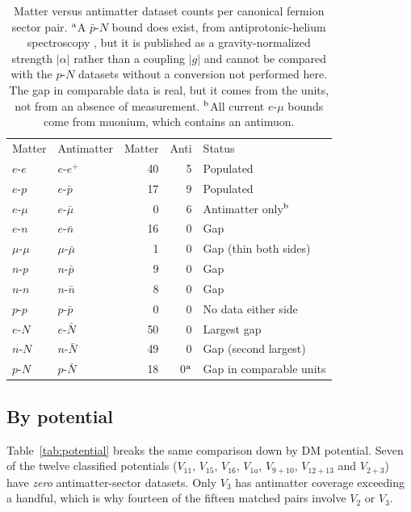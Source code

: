 \documentclass[
  aps,
  prd,
  reprint,
  amsmath,
  amssymb,
  nofootinbib,
  superscriptaddress,
  floatfix
]{revtex4-2}
\begin{document}
\begin{table}[t]
\caption{\label{tab:sector}%
Matter versus antimatter dataset counts per canonical fermion sector pair.
$^{\rm a}$A $\bar p$-$N$ bound does exist, from antiprotonic-helium
spectroscopy \cite{Salumbides2014}, but it is published as a
gravity-normalized strength $|\alpha|$ rather than a coupling $|g|$ and
cannot be compared with the $p$-$N$ datasets without a conversion not
performed here. The gap in comparable data is real, but it comes from the
units, not from an absence of measurement. $^{\rm b}$All current
$e$-$\mu$ bounds come from muonium, which contains an antimuon.}
\begin{ruledtabular}
\begin{tabular}{llrrl}
Matter & Antimatter & Matter & Anti & Status \\
\colrule
$e$-$e$     & $e$-$e^+$        & 40 & 5 & Populated \\
$e$-$p$     & $e$-$\bar p$     & 17 & 9 & Populated \\
$e$-$\mu$   & $e$-$\bar\mu$    &  0 & 6 & Antimatter only$^{\rm b}$ \\
$e$-$n$     & $e$-$\bar n$     & 16 & 0 & Gap \\
$\mu$-$\mu$ & $\mu$-$\bar\mu$  &  1 & 0 & Gap (thin both sides) \\
$n$-$p$     & $n$-$\bar p$     &  9 & 0 & Gap \\
$n$-$n$     & $n$-$\bar n$     &  8 & 0 & Gap \\
$p$-$p$     & $p$-$\bar p$     &  0 & 0 & No data either side \\
$e$-$N$     & $e$-$\bar N$     & 50 & 0 & Largest gap \\
$n$-$N$     & $n$-$\bar N$     & 49 & 0 & Gap (second largest) \\
$p$-$N$     & $p$-$\bar N$     & 18 & 0$^{\rm a}$ & Gap in comparable units \\
\end{tabular}
\end{ruledtabular}
\end{table}

\subsection{By potential}

Table~\ref{tab:potential} breaks the same comparison down by DM potential.
Seven of the twelve classified potentials ($V_{11}$, $V_{15}$, $V_{16}$,
$V_{1a}$, $V_{9+10}$, $V_{12+13}$ and $V_{2+3}$) have \emph{zero}
antimatter-sector datasets. Only $V_3$ has antimatter coverage exceeding a
handful, which is why fourteen of the fifteen matched pairs involve $V_2$
or $V_3$.
\end{document}
